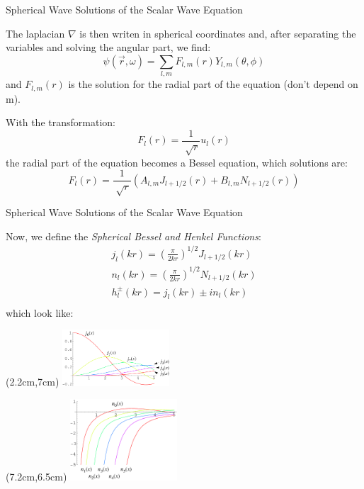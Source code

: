 \documentclass[10pt]{beamer}
\begin{document}

\begin{frame}[fragile]{Spherical Wave Solutions of the Scalar Wave Equation}

The laplacian $\nabla$ is then writen in spherical coordinates and, after separating the variables and solving the angular part, we find:
  \begin{equation*}
    \psi(\vec{r},\omega)=\sum_{l,m}F_{l,m}(r)Y_{l,m}(\theta,\phi)
  \end{equation*}
and $F_{l,m}(r)$ is the solution for the radial part of the equation (don't depend on m).

With the transformation:
  \begin{equation*}
      F_l(r)=\frac{1}{\sqrt[]{r}}u_l(r)
  \end{equation*}
the radial part of the equation becomes a Bessel equation, which solutions are:
\begin{equation*}
F_l(r)=\frac{1}{\sqrt[]{r}}\left( A_{l,m}J_{l+1/2}(r) + B_{l,m}N_{l+1/2}(r) \right)
\end{equation*}

\end{frame}


\begin{frame}[fragile]{Spherical Wave Solutions of the Scalar Wave Equation}

Now, we define the \emph{Spherical Bessel and Henkel Functions}:
  \begin{equation*}
    \begin{split}
      j_l(kr)=\left(\frac{\pi}{2kr}\right)^{1/2}J_{l+1/2}(kr)\\
      n_l(kr)=\left(\frac{\pi}{2kr}\right)^{1/2}N_{l+1/2}(kr)\\
      h_l^{\pm}(kr)=j_l(kr)\pm i n_l(kr)\\
    \end{split}
  \end{equation*}
which look like:
        \begin{textblock*}{3cm}(2.2cm,7cm)
        \includegraphics[width=4cm]{besselesf1}
        \end{textblock*}
        \begin{textblock*}{3cm}(7.2cm,6.5cm)
        \includegraphics[width=4cm]{besselesf2}
        \end{textblock*}

\end{frame}
\end{document}
